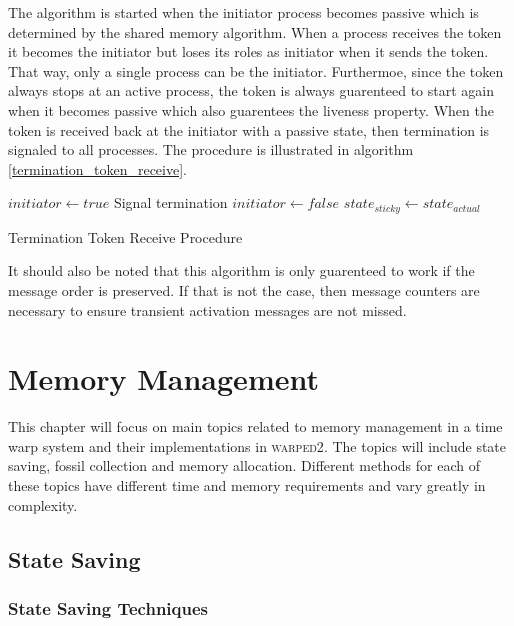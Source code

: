 \documentclass[11pt]{book}
\begin{document}
The algorithm is started when the initiator process becomes passive which is determined by
the shared memory algorithm. When a process receives the token it becomes the initiator
but loses its roles as initiator when it sends the token. That way, only a single process
can be the initiator. Furthermoe, since the token always stops at an active process, the
token is always guarenteed to start again when it becomes passive which also guarentees
the liveness property. When the token is received back at the initiator with a passive
state, then termination is signaled to all processes. The procedure is illustrated in
algorithm \ref{termination_token_receive}.

\begin{algorithm}
\DontPrintSemicolon
\SetAlgoVlined
{}
    $initiator \gets true$\;
     {
         {
            Signal termination\;
        }
    }  {
        $initiator \gets false$\;
        \;
    }
    $state_{sticky} \gets state_{actual}$\;
\caption{Termination Token Receive Procedure}\label{termination_token_receive}
\end{algorithm}

It should also be noted that this algorithm is only guarenteed to work if the message order
is preserved. If that is not the case, then message counters are necessary to ensure
transient activation messages are not missed.



\chapter{Memory Management}\label{memory_management}

This chapter will focus on main topics related to memory management in a time warp system
and their implementations in \textsc{warped2}. The topics will include state saving, fossil
collection and memory allocation. Different methods for each of these topics have different
time and memory requirements and vary greatly in complexity.

\section{State Saving}

\subsection{State Saving Techniques}
\end{document}
